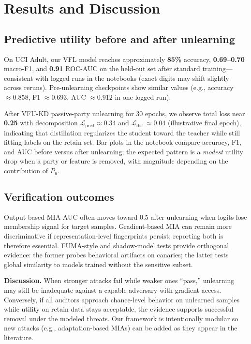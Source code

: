 \documentclass[sigconf,screen]{acmart}
\begin{document}
\section{Results and Discussion}

\subsection{Predictive utility before and after unlearning}
On UCI Adult, our VFL model reaches approximately \textbf{85\%} accuracy, \textbf{0.69--0.70} macro-F1, and \textbf{0.91} ROC-AUC on the held-out set after standard training---consistent with logged runs in the notebooks (exact digits may shift slightly across reruns). Pre-unlearning checkpoints show similar values (e.g., accuracy $\approx 0.858$, F1 $\approx 0.693$, AUC $\approx 0.912$ in one logged run).

After \textsc{VFU-KD} passive-party unlearning for 30 epochs, we observe total loss near \textbf{0.25} with decomposition $\mathcal{L}_{\text{pred}} \approx 0.34$ and $\mathcal{L}_{\text{dist}} \approx 0.04$ (illustrative final epoch), indicating that distillation regularizes the student toward the teacher while still fitting labels on the retain set. Bar plots in the notebook compare accuracy, F1, and AUC before versus after unlearning; the expected pattern is a \emph{modest} utility drop when a party or feature is removed, with magnitude depending on the contribution of $P_u$.

\subsection{Verification outcomes}
Output-based MIA AUC often moves toward 0.5 after unlearning when logits lose membership signal for target samples. Gradient-based MIA can remain more discriminative if representation-level fingerprints persist; reporting both is therefore essential. FUMA-style and shadow-model tests provide orthogonal evidence: the former probes behavioral artifacts on canaries; the latter tests global similarity to models trained without the sensitive subset.

\textbf{Discussion.} When stronger attacks fail while weaker ones ``pass,'' unlearning may still be inadequate against a capable adversary with gradient access. Conversely, if all auditors approach chance-level behavior on unlearned samples while utility on retain data stays acceptable, the evidence supports successful removal under the modeled threats. Our framework is intentionally modular so new attacks (e.g., adaptation-based MIAs) can be added as they appear in the literature.
\end{document}
